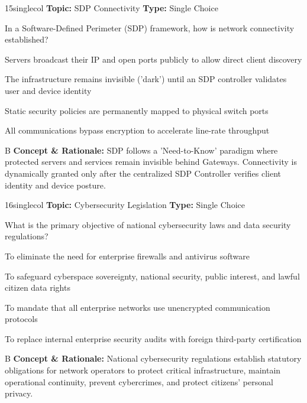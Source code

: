 \begin{qcard}{15}{singlecol}
\textcolor{darkslate!75}{\small\textbf{Topic:} SDP Connectivity \hfill \textbf{Type:} Single Choice}\vspace{0.4em}\par
In a Software-Defined Perimeter (SDP) framework, how is network connectivity established?
\begin{qoptions}
\item Servers broadcast their IP and open ports publicly to allow direct client discovery
\item The infrastructure remains invisible ('dark') until an SDP controller validates user and device identity
\item Static security policies are permanently mapped to physical switch ports
\item All communications bypass encryption to accelerate line-rate throughput
\end{qoptions}
\end{qcard}
\nopagebreak
\begin{explainbox}{B}
\textbf{Concept \& Rationale:} SDP follows a 'Need-to-Know' paradigm where protected servers and services remain invisible behind Gateways. Connectivity is dynamically granted only after the centralized SDP Controller verifies client identity and device posture.
\end{explainbox}

\begin{qcard}{16}{singlecol}
\textcolor{darkslate!75}{\small\textbf{Topic:} Cybersecurity Legislation \hfill \textbf{Type:} Single Choice}\vspace{0.4em}\par
What is the primary objective of national cybersecurity laws and data security regulations?
\begin{qoptions}
\item To eliminate the need for enterprise firewalls and antivirus software
\item To safeguard cyberspace sovereignty, national security, public interest, and lawful citizen data rights
\item To mandate that all enterprise networks use unencrypted communication protocols
\item To replace internal enterprise security audits with foreign third-party certification
\end{qoptions}
\end{qcard}
\nopagebreak
\begin{explainbox}{B}
\textbf{Concept \& Rationale:} National cybersecurity regulations establish statutory obligations for network operators to protect critical infrastructure, maintain operational continuity, prevent cybercrimes, and protect citizens' personal privacy.
\end{explainbox}

